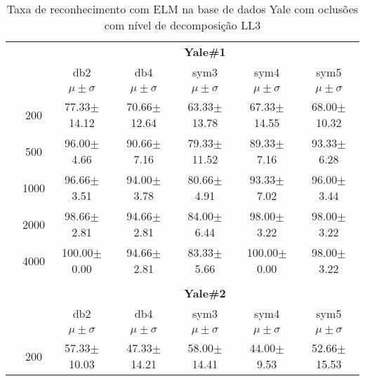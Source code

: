 \begin{table}[H]
	\centering
	\caption{Taxa de reconhecimento com ELM na base de dados Yale com oclusões com nível de decomposição LL3}
    \label{tab:reconhecimento_Yale_com_oclusao}
    \hspace{0.5in}
	\begin{tabular}{|c|c|c c c c c|}
\cline{3-7}
\multicolumn{2}{c|}{\multirow{3}{*}{}} & \multicolumn{5}{c|}{\textbf{Yale\#1}}   \\\cline{3-7} 
\multicolumn{2}{c|}{}  & db2 & db4 & sym3 & sym4 & sym5 \\\cline{3-7}%
\multicolumn{2}{c|}{}& $\mu \pm \sigma$ & $\mu \pm \sigma$ & $\mu \pm \sigma$ & $\mu \pm \sigma$ & $\mu \pm \sigma$ \\\hline


\multicolumn{1}{|c|}{ \multirow{5}{*}{\rotatebox[origin=c]{90}{\textbf{Neurônios}}} }
& 200	&77.33$\pm$14.12	&70.66$\pm$12.64	&63.33$\pm$13.78	&67.33$\pm$14.55	&68.00$\pm$10.32 	\\\cline{2-7}

& 500	&96.00$\pm$4.66		&90.66$\pm$7.16		&79.33$\pm$11.52	&89.33$\pm$7.16		&93.33$\pm$6.28 	\\\cline{2-7}

& 1000	&96.66$\pm$3.51		&94.00$\pm$3.78		&80.66$\pm$4.91		&93.33$\pm$7.02		&96.00$\pm$3.44 	\\\cline{2-7}
	
& 2000	&98.66$\pm$2.81		&94.66$\pm$2.81		&84.00$\pm$6.44		&98.00$\pm$3.22		&98.00$\pm$3.22 	\\\cline{2-7}
& 4000	&100.00$\pm$0.00	&94.66$\pm$2.81		&83.33$\pm$5.66		& 100.00$\pm$0.00	&98.00$\pm$3.22 	\\\midrule 
\multicolumn{7}{c}{}\\ 


\cline{3-7}
\multicolumn{2}{c|}{\multirow{3}{*}{}} & \multicolumn{5}{c|}{\textbf{Yale\#2}}   \\\cline{3-7} 
\multicolumn{2}{c|}{}  & db2 & db4 & sym3 & sym4 & sym5 \\\cline{3-7}%
\multicolumn{2}{c|}{}& $\mu \pm \sigma$ & $\mu \pm \sigma$ & $\mu \pm \sigma$ & $\mu \pm \sigma$ & $\mu \pm \sigma$ \\\hline


\multicolumn{1}{|c|}{ \multirow{5}{*}{\rotatebox[origin=c]{90}{\textbf{Neurônios}}} }
& 200	 	&57.33$\pm$10.03	&47.33$\pm$14.21	&58.00$\pm$14.41	&44.00$\pm$9.53		&52.66$\pm$15.53 \\\cline{2-7}


\end{tabular}
\end{table}
